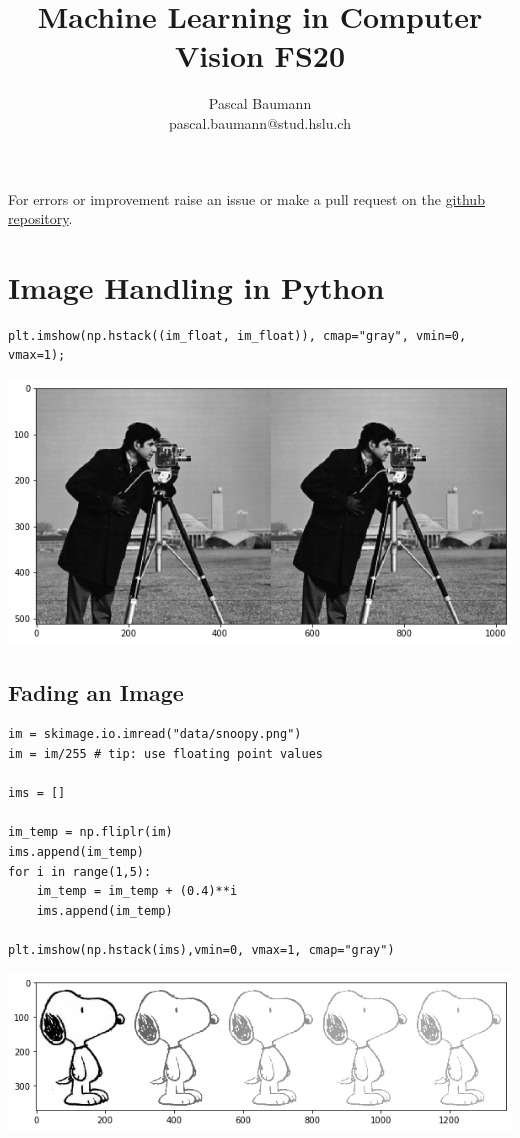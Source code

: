 \documentclass[11pt]{article}
\theoremstyle{definition}
\begin{document}
	
\title{Machine Learning in Computer Vision FS20}
\author{Pascal Baumann\\pascal.baumann@stud.hslu.ch}
\maketitle



For errors or improvement raise an issue or make a pull request on the \href{https://github.com/KilnOfTheSecondFlame/mse_summaries}{github repository}.

\tableofcontents
\newpage


\section{Image Handling in Python}

\begin{verbatim}
plt.imshow(np.hstack((im_float, im_float)), cmap="gray", vmin=0, vmax=1);
\end{verbatim}

\begin{center}
	\includegraphics[width=0.7\linewidth]{img/hstack_image}
\end{center}

\subsection{Fading an Image}
\begin{verbatim}
im = skimage.io.imread("data/snoopy.png")
im = im/255 # tip: use floating point values

ims = []

im_temp = np.fliplr(im)
ims.append(im_temp)
for i in range(1,5):
	im_temp = im_temp + (0.4)**i
	ims.append(im_temp)

plt.imshow(np.hstack(ims),vmin=0, vmax=1, cmap="gray")
\end{verbatim}

\begin{center}
	\includegraphics[width=0.7\linewidth]{img/snoopy_fade}
\end{center}
\end{document}
